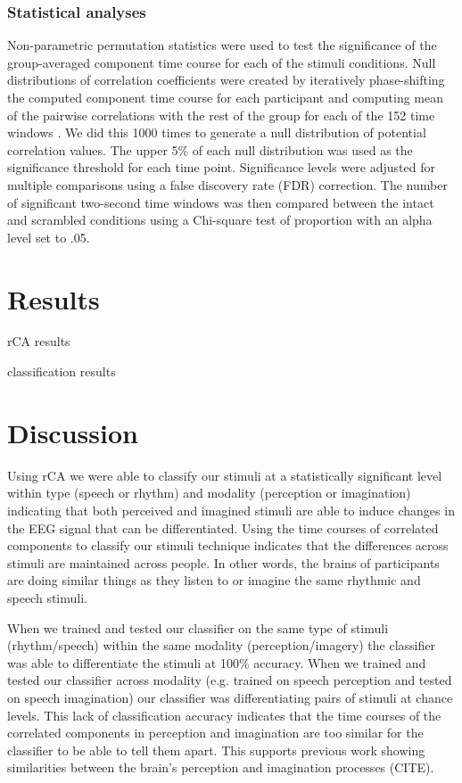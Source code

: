 \documentclass[utf8]{frontiersSCNS} %
\begin{document}
\subsubsection{Statistical analyses}
Non-parametric permutation statistics were used to test the significance of the group-averaged component time course for each of the stimuli conditions. 
Null distributions of correlation coefficients were created by iteratively phase-shifting the computed component time course for each participant and computing mean of the pairwise correlations with the rest of the group for each of the 152 time windows \citep{theiler1992testing}. 
We did this 1000 times to generate a null distribution of potential correlation values. The upper 5\% of each null distribution was used as the significance threshold for each time point. 
Significance levels were adjusted for multiple comparisons using a false discovery rate (FDR) correction. 
The number of significant two-second time windows was then compared between the intact and scrambled conditions using a Chi-square test of proportion with an alpha level set to .05. 

\section{Results}
rCA results 

classification results

\section{Discussion}
Using \ac{rCA} we were able to classify our stimuli at a statistically significant level within type (speech or rhythm) and modality (perception or imagination) indicating that both perceived and imagined stimuli are able to induce changes in the EEG signal that can be differentiated. 
Using the time courses of correlated components to classify our stimuli technique indicates that the differences across stimuli are maintained across people. 
In other words, the brains of participants are doing similar things as they listen to or imagine the same rhythmic and speech stimuli.

When we trained and tested our classifier on the same type of stimuli (rhythm/speech) within the same modality (perception/imagery) the classifier was able to differentiate the stimuli at 100\% accuracy.
When we trained and tested our classifier across modality (e.g. trained on speech perception and tested on speech imagination) our classifier was differentiating pairs of stimuli at chance levels. 
This lack of classification accuracy indicates that the time courses of the correlated components in perception and imagination are too similar for the classifier to be able to tell them apart.
This supports previous work showing similarities between the brain's perception and imagination processes (CITE).
\end{document}
